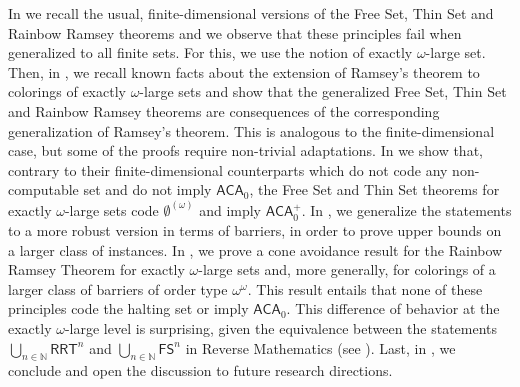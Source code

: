 \documentclass[10pt,a4paper]{article}
\newcommand{\Psf}{\mathsf{P}}
\newcommand{\Qsf}{\mathsf{Q}}
\newcommand{\ACA}[0]{\mathsf{ACA}}
\newcommand{\RRT}[0]{\mathsf{RRT}}
\newcommand{\FS}[0]{\mathsf{FS}}
\newcommand{\TS}[0]{\mathsf{TS}}
\newcommand{\NN}[0]{\mathbb{N}}
\numberwithin{theorem}{section}
\begin{document}
In  we recall the usual, finite-dimensional versions of the Free Set, Thin Set and Rainbow Ramsey theorems and we observe that these principles fail when generalized to all finite sets. For this, we use the notion of exactly $\omega$-large set. Then, in , we recall known facts about the extension of Ramsey's theorem to colorings of exactly $\omega$-large sets and show that the generalized Free Set, Thin Set and Rainbow Ramsey theorems are consequences of the corresponding generalization of Ramsey's theorem. This is analogous to the finite-dimensional case, but some of the proofs require non-trivial adaptations. %
In  we show that, contrary to their finite-dimensional counterparts which do not code any non-computable set and do not imply $\ACA_0$, the Free Set and Thin Set theorems for exactly $\omega$-large sets code $\emptyset^{(\omega)}$ and imply $\ACA_0^+$. In , we generalize the statements to a more robust version in terms of barriers, in order to prove upper bounds on a larger class of instances. In , we prove a cone avoidance result for the Rainbow Ramsey Theorem for exactly $\omega$-large sets and, more generally, for colorings of a larger class of barriers of order type $\omega^\omega$. This result entails that none of these principles code the halting set or imply $\ACA_0$. This difference of behavior at the exactly $\omega$-large level is surprising, given the equivalence between the statements $\bigcup_{n \in \NN}\RRT^n$ and $\bigcup_{n \in \NN} \FS^n$ in Reverse Mathematics (see \cite{patey2015somewhere,wang2014some}). %
Last, in , we conclude and open the discussion to future research directions.

\end{document}
